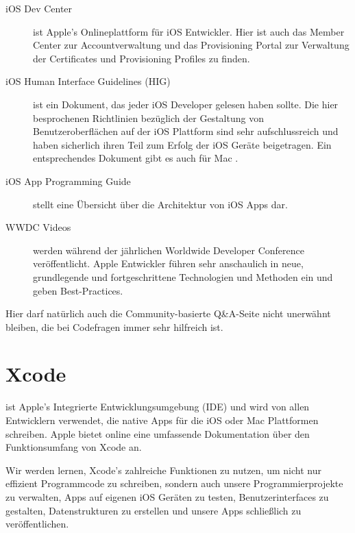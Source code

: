 \documentclass[parskip=half, final]{scrreprt}
\begin{document}
\begin{description}
\item[iOS Dev Center]  ist Apple's Onlineplattform für iOS Entwickler. Hier ist auch das Member Center zur Accountverwaltung und das Provisioning Portal zur Verwaltung der Certificates und Provisioning Profiles  zu finden.
\item[iOS Human Interface Guidelines (HIG)]  ist ein Dokument, das jeder iOS Developer gelesen haben sollte. Die hier besprochenen Richtlinien bezüglich der Gestaltung von Benutzeroberflächen auf der iOS Plattform sind sehr aufschlussreich und haben sicherlich ihren Teil zum Erfolg der iOS Geräte beigetragen. Ein entsprechendes Dokument gibt es auch für Mac .
\item[iOS App Programming Guide]  stellt eine Übersicht über die Architektur von iOS Apps dar.
\item[WWDC Videos]  werden während der jährlichen Worldwide Developer Conference veröffentlicht. Apple Entwickler führen sehr anschaulich in neue, grundlegende und fortgeschrittene Technologien und Methoden ein und geben Best-Practices.
\end{description}

Hier darf natürlich auch die Community-basierte Q\&A-Seite  nicht unerwähnt bleiben, die bei Codefragen immer sehr hilfreich ist.


\chapter{Xcode}

 ist Apple's Integrierte Entwicklungsumgebung (IDE) und wird von allen Entwicklern verwendet, die native Apps für die iOS oder Mac Plattformen schreiben. Apple bietet online  eine umfassende Dokumentation über den Funktionsumfang von Xcode an.

Wir werden lernen, Xcode's zahlreiche Funktionen zu nutzen, um nicht nur effizient Programmcode zu schreiben, sondern auch unsere Programmierprojekte zu verwalten, Apps auf eigenen iOS Geräten zu testen, Benutzerinterfaces zu gestalten, Datenstrukturen zu erstellen und unsere Apps schließlich zu veröffentlichen.
\end{document}
